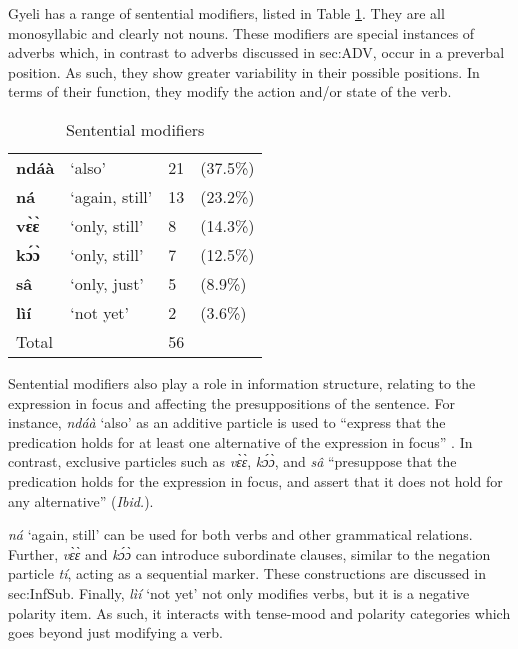 Gyeli has a range of sentential modifiers, listed in Table \ref{Tab:SentMod}. They are all monosyllabic and clearly not nouns. These modifiers are special instances of adverbs which, in contrast to adverbs discussed in {sec:ADV}, occur in a preverbal position. As such, they show greater variability in their possible positions. In terms of their function, they modify the action and/or state of the verb.

\begin{table}[!h]
\centering
\begin{tabular}{llll}
 \midrule 
{\bfseries ndáà} & `also' & 21 & (37.5\%)\\
{\bfseries ná} & `again, still' & 13 & (23.2\%) \\
{\bfseries vɛ̀ɛ̀} & `only, still' & 8 & (14.3\%) \\
{\bfseries kɔ́ɔ̀} & `only, still' & 7 & (12.5\%) \\
{\bfseries sâ} & `only, just' &  5 & (8.9\%) \\
{\bfseries lìí}  & `not yet'    & 2  &  (3.6\%)   \\
 \midrule
Total & & 56 \\
 \midrule
\end{tabular}
\caption{Sentential modifiers}
\label{Tab:SentMod}
\end{table}

Sentential modifiers also play a role in information structure, relating to the expression in focus and affecting the presuppositions of the sentence. For instance, {\itshape ndáà} `also' as an additive particle is used to  ``express that the predication holds for at least one alternative of the expression in focus'' \citep[111]{krifka99}. In contrast,  exclusive particles such as {\itshape vɛ̀ɛ̀}, {\itshape kɔ́ɔ̀}, and {\itshape sâ} ``presuppose that the predication holds for the expression in focus, and assert that it does not hold for any alternative'' ({\itshape Ibid.}). 

{\itshape ná} `again, still' can be used for both verbs and other grammatical relations. Further, {\itshape vɛ̀ɛ̀} and {\itshape kɔ́ɔ̀} can introduce subordinate clauses, similar to the negation particle {\itshape tí}, acting as a sequential marker. These constructions are discussed in {sec:InfSub}. Finally, {\itshape lìí} `not yet' not only modifies verbs, but it is a negative polarity item. As such, it interacts with tense-mood and polarity categories which goes beyond just modifying a verb.  

